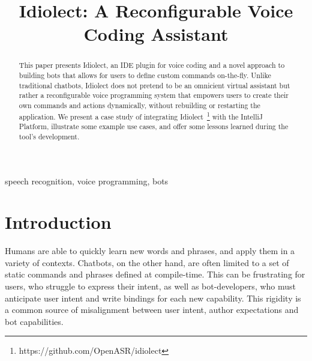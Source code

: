 \documentclass[conference]{IEEEtran}
\begin{document}
\title{Idiolect: A Reconfigurable Voice Coding Assistant}

\author{
\and
{}
\and
{}
\and
{}
}

\maketitle

\begin{abstract}
This paper presents Idiolect, an IDE plugin for voice coding and a novel approach to building bots that allows for users to define custom commands on-the-fly. Unlike traditional chatbots, Idiolect does not pretend to be an omnicient virtual assistant but rather a reconfigurable voice programming system that empowers users to create their own commands and actions dynamically, without rebuilding or restarting the application. We present a case study of integrating Idiolect~\footnote{https://github.com/OpenASR/idiolect} with the IntelliJ Platform, illustrate some example use cases, and offer some lessons learned during the tool's development.
\end{abstract}

\begin{IEEEkeywords}
    speech recognition, voice programming, bots
\end{IEEEkeywords}

\section{Introduction}


Humans are able to quickly learn new words and phrases, and apply them in a variety of contexts. Chatbots, on the other hand, are often limited to a set of static commands and phrases defined at compile-time. This can be frustrating for users, who struggle to express their intent, as well as bot-developers, who must anticipate user intent and write bindings for each new capability. This rigidity is a common source of misalignment between user intent, author expectations and bot capabilities.
\end{document}
